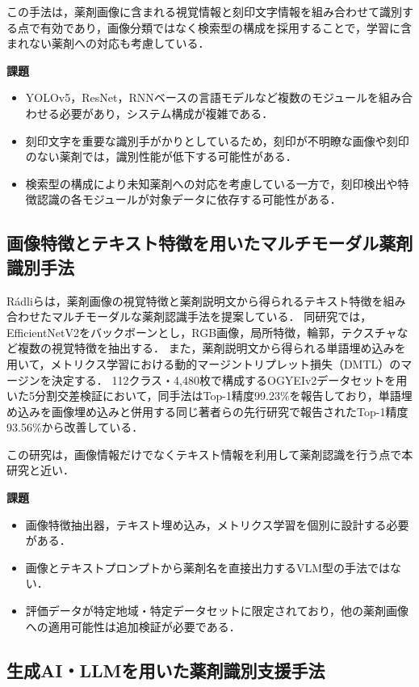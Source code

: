 \documentclass[dvipdfmx]{jsarticle}
\begin{document}
この手法は，薬剤画像に含まれる視覚情報と刻印文字情報を組み合わせて識別する点で有効であり，画像分類ではなく検索型の構成を採用することで，学習に含まれない薬剤への対応も考慮している．

\textbf{課題}
\begin{itemize}
  \item YOLOv5，ResNet，RNNベースの言語モデルなど複数のモジュールを組み合わせる必要があり，システム構成が複雑である．
  \item 刻印文字を重要な識別手がかりとしているため，刻印が不明瞭な画像や刻印のない薬剤では，識別性能が低下する可能性がある．
  \item 検索型の構成により未知薬剤への対応を考慮している一方で，刻印検出や特徴認識の各モジュールが対象データに依存する可能性がある．
\end{itemize}

\subsection{画像特徴とテキスト特徴を用いたマルチモーダル薬剤識別手法}

Rádliら\cite{radli2024metric}は，薬剤画像の視覚特徴と薬剤説明文から得られるテキスト特徴を組み合わせたマルチモーダルな薬剤認識手法を提案している．
同研究では，EfficientNetV2をバックボーンとし，RGB画像，局所特徴，輪郭，テクスチャなど複数の視覚特徴を抽出する．
また，薬剤説明文から得られる単語埋め込みを用いて，メトリクス学習における動的マージントリプレット損失（DMTL）のマージンを決定する．
112クラス・4,480枚で構成するOGYEIv2データセットを用いた5分割交差検証において，同手法はTop-1精度99.23\%を報告しており，単語埋め込みを画像埋め込みと併用する同じ著者らの先行研究\cite{radli2024word}で報告されたTop-1精度93.56\%から改善している．

この研究は，画像情報だけでなくテキスト情報を利用して薬剤認識を行う点で本研究と近い．

\textbf{課題}
\begin{itemize}
  \item 画像特徴抽出器，テキスト埋め込み，メトリクス学習を個別に設計する必要がある．
  \item 画像とテキストプロンプトから薬剤名を直接出力するVLM型の手法ではない．
  \item 評価データが特定地域・特定データセットに限定されており，他の薬剤画像への適用可能性は追加検証が必要である．
\end{itemize}

\subsection{生成AI・LLMを用いた薬剤識別支援手法}
\end{document}
